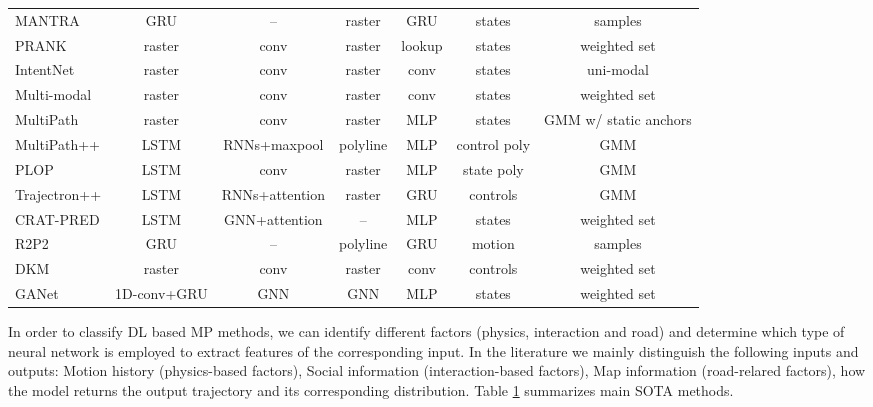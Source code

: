\begin{table}[h!]
\begin{adjustbox}{max width=\textwidth}
\begin{tabular}{l |ccc|c|c|c}
			MANTRA \cite{marchetti2020mantra}	& GRU	& --	& raster	& GRU	& states	& samples	\\
			PRANK \cite{biktairov2020prank}	& raster	& conv	& raster	& lookup	& states	& weighted set	\\
			IntentNet \cite{casas2018intentnet}	& raster	& conv	& raster	& conv	& states	& uni-modal	\\
			Multi-modal \cite{cui2019multimodal}	& raster	& conv	& raster	& conv	& states	& weighted set	\\
			MultiPath \cite{chai2019multipath}	& raster	& conv	& raster	& MLP	& states	& GMM w/ static anchors	\\
			MultiPath++ \cite{varadarajan2022multipath++}	& LSTM	& RNNs+maxpool	& polyline	& MLP	& control poly	& GMM	\\
			PLOP \cite{buhet2021plop}	& LSTM	& conv	& raster	& MLP	& state poly	& GMM	\\
			Trajectron++ \cite{salzmann2020trajectron++}	& LSTM	& RNNs+attention	& raster	& GRU	& controls	& GMM	\\
			CRAT-PRED \cite{schmidt2022crat}	& LSTM	& GNN+attention	& --	& MLP	& states	& weighted set	\\
			R2P2 \cite{rhinehart2018r2p2}	& GRU	& --	& polyline	& GRU	& motion	& samples	\\
			DKM \cite{cui2020deep}	& raster	& conv	& raster	& conv	& controls	& weighted set	\\
			GANet \cite{wang2022ganet}	& 1D-conv+GRU	& GNN	& GNN	& MLP	& states	& weighted set	\\
			\bottomrule
		\end{tabular}
		\label{table:2_dl_related_work_mp}
	\end{adjustbox}
\end{table}

In order to classify \ac{DL} based \ac{MP} methods, we can identify different factors (physics, interaction and road) and determine which type of neural network is employed to extract features of the corresponding input. In the literature we mainly distinguish the following inputs and outputs: Motion history (physics-based factors), Social information (interaction-based factors), Map information (road-relared factors), how the model returns the output trajectory and its corresponding distribution. Table \ref{table:2_dl_related_work_mp} summarizes main \ac{SOTA} methods.

